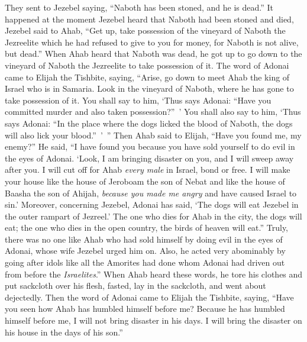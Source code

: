 \begin{biblechapter}
\verse They sent to Jezebel saying, “Naboth has been stoned, and he is dead.”
\verse It happened at the moment Jezebel heard that Naboth had been stoned and died, Jezebel said to Ahab, “Get up, take possession of the vineyard of Naboth the Jezreelite which he had refused to give to you for money, for Naboth is not alive, but dead.”
\verse When Ahab heard that Naboth was dead, he got up to go down to the vineyard of Naboth the Jezreelite to take possession of it.
 The word of Adonai came to Elijah the Tishbite, saying,
\verse “Arise, go down to meet Ahab the king of Israel who is in Samaria. Look in the vineyard of Naboth, where he has gone to take possession of it.
\verse You shall say to him, ‘Thus says Adonai: “Have you committed murder and also taken possession?” ’ You shall also say to him, ‘Thus says Adonai: “In the place where the dogs licked the blood of Naboth, the dogs will also lick your blood.” ’ ”
\verse Then Ahab said to Elijah, “Have you found me, my enemy?” He said, “I have found you because you have sold yourself to do evil in the eyes of Adonai.
\verse ‘Look, I am bringing disaster on you, and I will sweep away after you. I will cut off for Ahab \textit{every male} in Israel, bond or free.
\verse I will make your house like the house of Jeroboam the son of Nebat and like the house of Baasha the son of Ahijah, \textit{because you made me angry} and have caused Israel to sin.’
\verse Moreover, concerning Jezebel, Adonai has said, ‘The dogs will eat Jezebel in the outer rampart of Jezreel.’
\verse The one who dies for Ahab in the city, the dogs will eat; the one who dies in the open country, the birds of heaven will eat.”
\verse Truly, there was no one like Ahab who had sold himself by doing evil in the eyes of Adonai, whose wife Jezebel urged him on.
\verse Also, he acted very abominably by going after idols like all the Amorites had done whom Adonai had driven out from before the \textit{Israelites}.”
\verse When Ahab heard these words, he tore his clothes and put sackcloth over his flesh, fasted, lay in the sackcloth, and went about dejectedly.
\verse Then the word of Adonai came to Elijah the Tishbite, saying,
\verse “Have you seen how Ahab has humbled himself before me? Because he has humbled himself before me, I will not bring disaster in his days. I will bring the disaster on his house in the days of his son.”
\end{biblechapter}

